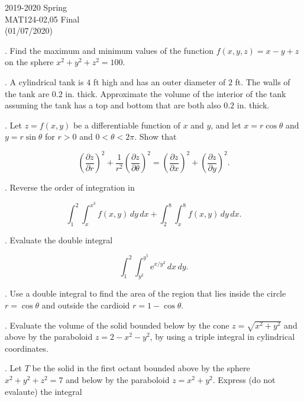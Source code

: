 \documentclass{article}
\begin{document}
\pagestyle{empty}
\large

\begin{center}
2019-2020 Spring \\MAT124-02,05 Final\\(01/07/2020)
\end{center}

. Find the maximum and minimum values of the function $f(x,y,z)=x-y+z$ on the sphere $x^2+y^2+z^2=100$.

\hfill

. A cylindrical tank is $4$ ft high and has an outer diameter of $2$ ft. The walls of the tank are $0.2$ in. thick. Approximate the volume of the interior of the tank assuming the tank has a top and bottom that are both also $0.2$ in. thick.

\hfill

. Let $z=f(x,y)$ be a differentiable function of $x$ and $y$, and let $x=r\cos\theta$ and $y=r\sin\theta$ for $r>0$ and $0<\theta<2\pi$. Show that

\[\left(\frac{\partial z}{\partial r}\right)^2+\frac1{r^2}\left(\frac{\partial z}{\partial\theta}\right)^2=\left(\frac{\partial z}{\partial x}\right)^2+\left(\frac{\partial z}{\partial y}\right)^2.\]

\hfill

. Reverse the order of integration in

\[\displaystyle\int_1^2\int_x^{x^3}f(x,y)\,dy\,dx+\int_2^8\int_x^8f(x,y)\,dy\,dx.\]

\hfill

. Evaluate the double integral

\[\int_1^2\int_{y^2}^{y^5}\mathrm{e}^{x/y^2}\,dx\,dy.\]

\hfill

. Use a double integral to find the area of the region that lies inside the circle $r=\cos\theta$ and outside the cardioid $r=1-\cos\theta$.

\hfill

. Evaluate the volume of the solid bounded below by the cone $z=\sqrt{x^2+y^2}$ and above by the paraboloid $z=2-x^2-y^2$, by using a triple integral in cylindrical coordinates.

\hfill

. Let $T$ be the solid in the first octant bounded above by the sphere $x^2+y^2+z^2=7$ and below by the paraboloid $z=x^2+y^2$. Express (do not evalaute) the integral
\end{document}
